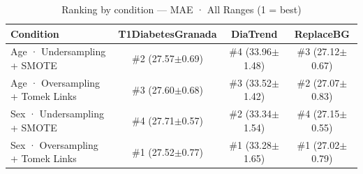 \begin{table}[htbp]
\centering
\small
\caption{Ranking by condition — MAE · All Ranges  (1 = best)}
\label{tab:ranking_mae_entire_family_mechanism_random+guided}
\begin{tabular}{lccc}
\toprule
\textbf{Condition} & \textbf{T1DiabetesGranada} & \textbf{DiaTrend} & \textbf{ReplaceBG} \\
\midrule
Age · Undersampling + SMOTE & \#2 (27.57$\pm$0.69) & \#4 (33.96$\pm$1.48) & \#3 (27.12$\pm$0.67) \\
Age · Oversampling + Tomek Links & \#3 (27.60$\pm$0.68) & \#3 (33.52$\pm$1.42) & \#2 (27.07$\pm$0.83) \\
\midrule
Sex · Undersampling + SMOTE & \#4 (27.71$\pm$0.57) & \#2 (33.34$\pm$1.54) & \#4 (27.15$\pm$0.55) \\
Sex · Oversampling + Tomek Links & \#1 (27.52$\pm$0.77) & \#1 (33.28$\pm$1.65) & \#1 (27.02$\pm$0.79) \\
\bottomrule
\end{tabular}
\end{table}